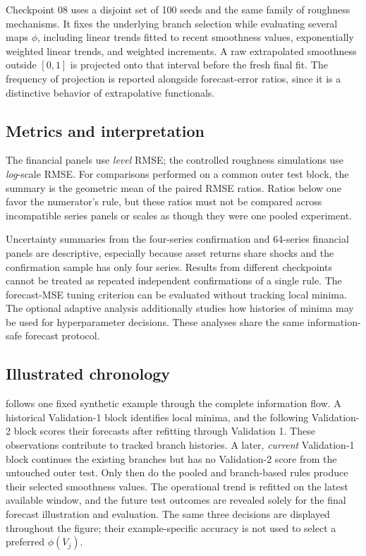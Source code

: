 Checkpoint 08 uses a disjoint set of 100 seeds and the same family
of roughness mechanisms. It fixes the underlying branch selection
while evaluating several maps $\phi$, including linear trends fitted
to recent smoothness values, exponentially weighted linear trends,
and weighted increments. A raw extrapolated smoothness outside
$[0,1]$ is projected onto that interval before the fresh final fit.
The frequency of projection is reported alongside forecast-error
ratios, since it is a distinctive behavior of extrapolative
functionals.


\subsection{Metrics and interpretation}

The financial panels use \emph{level} RMSE; the controlled
roughness simulations use \emph{log}-scale RMSE. For comparisons
performed on a common outer test block, the summary is the
geometric mean of the paired RMSE ratios. Ratios below one favor
the numerator's rule, but these ratios must not be compared across
incompatible series panels or scales as though they were one
pooled experiment.

Uncertainty summaries from the four-series confirmation and
64-series financial panels are descriptive, especially because
asset returns share shocks and the confirmation sample has only
four series. Results from different checkpoints cannot be treated
as repeated independent confirmations of a single rule.
The forecast-MSE tuning criterion can be evaluated without tracking
local minima. The optional adaptive analysis additionally studies
how histories of minima may be used for hyperparameter decisions.
These analyses share the same information-safe forecast protocol.



\subsection{Illustrated chronology}

 follows one fixed synthetic example
through the complete information flow. A historical Validation-1 block
identifies local minima, and the following Validation-2 block scores their
forecasts after refitting through Validation 1. These observations contribute
to tracked branch histories. A later, \emph{current} Validation-1 block
continues the existing branches but has no Validation-2 score from the
untouched outer test. Only then do the pooled and branch-based rules
produce their selected smoothness values. The operational trend is
refitted on the latest available window, and the future test outcomes
are revealed solely for the final forecast illustration and evaluation.
The same three decisions are displayed throughout the figure; their
example-specific accuracy is not used to select a preferred
$\phi(V_j)$.

